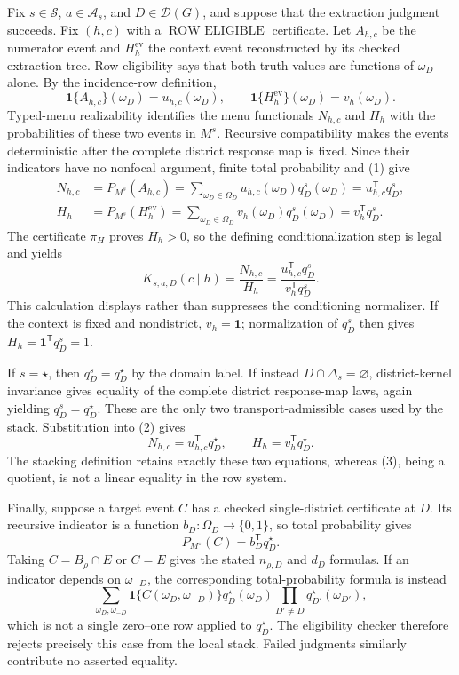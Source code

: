 Fix \(s\in\mathcal S\), \(a\in\mathcal A_s\), and \(D\in\mathcal D(G)\), and suppose that the extraction judgment succeeds.  Fix \((h,c)\) with a \(\operatorname{ROW\_ELIGIBLE}\) certificate.  Let \(A_{h,c}\) be the numerator event and \(H_h^{\mathrm{ev}}\) the context event reconstructed by its checked extraction tree.  Row eligibility says that both truth values are functions of \(\omega_D\) alone.  By the incidence-row definition,
\[
\mathbf 1\{A_{h,c}\}(\omega_D)=u_{h,c}(\omega_D),
\qquad
\mathbf 1\{H_h^{\mathrm{ev}}\}(\omega_D)=v_h(\omega_D).
\tag{1}
\]
Typed-menu realizability identifies the menu functionals \(N_{h,c}\) and \(H_h\) with the probabilities of these two events in \(M^s\).  Recursive compatibility makes the events deterministic after the complete district response map is fixed.  Since their indicators have no nonfocal argument, finite total probability and (1) give
\[
\begin{aligned}
N_{h,c}
&=P_{M^s}(A_{h,c})
=\sum_{\omega_D\in\Omega_D}u_{h,c}(\omega_D)q_D^s(\omega_D)
=u_{h,c}^{\mathsf T}q_D^s,\\
H_h
&=P_{M^s}(H_h^{\mathrm{ev}})
=\sum_{\omega_D\in\Omega_D}v_h(\omega_D)q_D^s(\omega_D)
=v_h^{\mathsf T}q_D^s.
\end{aligned}
\tag{2}
\]
The certificate \(\pi_H\) proves \(H_h>0\), so the defining conditionalization step is legal and yields
\[
K_{s,a,D}(c\mid h)
=\frac{N_{h,c}}{H_h}
=\frac{u_{h,c}^{\mathsf T}q_D^s}{v_h^{\mathsf T}q_D^s}.
\tag{3}
\]
This calculation displays rather than suppresses the conditioning normalizer.  If the context is fixed and nondistrict, \(v_h=\mathbf 1\); normalization of \(q_D^s\) then gives \(H_h=\mathbf 1^{\mathsf T}q_D^s=1\).

If \(s=\star\), then \(q_D^s=q_D^\star\) by the domain label.  If instead \(D\cap\Delta_s=\varnothing\), district-kernel invariance gives equality of the complete district response-map laws, again yielding \(q_D^s=q_D^\star\).  These are the only two transport-admissible cases used by the stack.  Substitution into (2) gives
\[
N_{h,c}=u_{h,c}^{\mathsf T}q_D^\star,
\qquad
H_h=v_h^{\mathsf T}q_D^\star.
\tag{4}
\]
The stacking definition retains exactly these two equations, whereas (3), being a quotient, is not a linear equality in the row system.

Finally, suppose a target event \(C\) has a checked single-district certificate at \(D\).  Its recursive indicator is a function \(b_D:\Omega_D\to\{0,1\}\), so total probability gives
\[
P_{M^\star}(C)=b_D^{\mathsf T}q_D^\star.
\tag{5}
\]
Taking \(C=B_\rho\cap E\) or \(C=E\) gives the stated \(n_{\rho,D}\) and \(d_D\) formulas.  If an indicator depends on \(\omega_{-D}\), the corresponding total-probability formula is instead
\[
\sum_{\omega_D,\omega_{-D}}
\mathbf 1\{C(\omega_D,\omega_{-D})\}
q_D^\star(\omega_D)
\prod_{D'\ne D}q_{D'}^\star(\omega_{D'}),
\]
which is not a single zero--one row applied to \(q_D^\star\).  The eligibility checker therefore rejects precisely this case from the local stack.  Failed judgments similarly contribute no asserted equality.